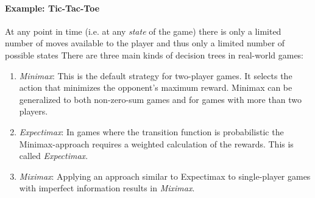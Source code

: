 \paragraph{Example: Tic-Tac-Toe}
At any point in time (i.e. at any \textit{state} of the game) there is only a limited number of moves available to the player and thus only a limited number of possible states 
There are three main kinds of decision trees in real-world games:
\begin{enumerate}[label=\arabic*)]
    \item \textit{Minimax}: This is the default strategy for two-player games. It selects the action that minimizes the opponent's maximum reward. Minimax can be generalized to both non-zero-sum games and for games with more than two players. 
    \item \textit{Expectimax}: In games where the transition function is probabilistic the Minimax-approach requires a weighted calculation of the rewards. This is called \textit{Expectimax}.
    \item \textit{Miximax}: Applying an approach similar to Expectimax to single-player games with imperfect information results in \textit{Miximax}.
\end{enumerate}

